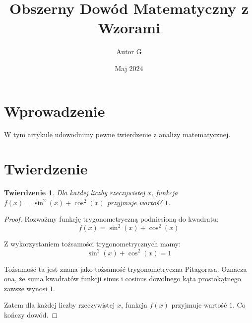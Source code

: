 \documentclass{article}
\title{Obszerny Dowód Matematyczny z Wzorami}
\author{Autor G}
\date{Maj 2024}
\theoremstyle{plain}
\newtheorem{theorem}{Twierdzenie}
\begin{document}
\maketitle

\section{Wprowadzenie}

W tym artykule udowodnimy pewne twierdzenie z analizy matematycznej.

\section{Twierdzenie}

\begin{theorem}
Dla każdej liczby rzeczywistej $x$, funkcja $f(x) = \sin^2(x) + \cos^2(x)$ przyjmuje wartość $1$.
\end{theorem}

\begin{proof}
Rozważmy funkcję trygonometryczną podniesioną do kwadratu:
\[ f(x) = \sin^2(x) + \cos^2(x) \]

Z wykorzystaniem tożsamości trygonometrycznych mamy:
\[ \sin^2(x) + \cos^2(x) = 1 \]

Tożsamość ta jest znana jako tożsamość trygonometryczna Pitagorasa. Oznacza ona, że suma kwadratów funkcji sinus i cosinus dowolnego kąta prostokątnego zawsze wynosi $1$.

Zatem dla każdej liczby rzeczywistej $x$, funkcja $f(x)$ przyjmuje wartość $1$. Co kończy dowód.
\end{proof}
\end{document}
